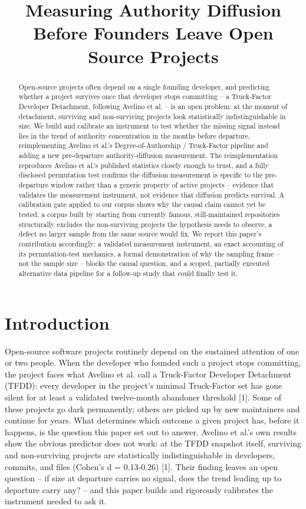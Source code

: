 \documentclass[11pt,letterpaper]{article}
\title{Measuring Authority Diffusion Before Founders Leave Open Source Projects}
\author{}
\date{}
\begin{document}
\maketitle

\begin{abstract}
Open-source projects often depend on a single founding developer, and predicting whether a project survives once that developer stops committing -- a Truck-Factor Developer Detachment, following Avelino et al. -- is an open problem: at the moment of detachment, surviving and non-surviving projects look statistically indistinguishable in size. We build and calibrate an instrument to test whether the missing signal instead lies in the trend of authority concentration in the months before departure, reimplementing Avelino et al.'s Degree-of-Authorship / Truck-Factor pipeline and adding a new pre-departure authority-diffusion measurement. The reimplementation reproduces Avelino et al.'s published statistics closely enough to trust, and a fully disclosed permutation test confirms the diffusion measurement is specific to the pre-departure window rather than a generic property of active projects -- evidence that validates the measurement instrument, not evidence that diffusion predicts survival. A calibration gate applied to our corpus shows why the causal claim cannot yet be tested: a corpus built by starting from currently famous, still-maintained repositories structurally excludes the non-surviving projects the hypothesis needs to observe, a defect no larger sample from the same source would fix. We report this paper's contribution accordingly: a validated measurement instrument, an exact accounting of its permutation-test mechanics, a formal demonstration of why the sampling frame -- not the sample size -- blocks the causal question, and a scoped, partially executed alternative data pipeline for a follow-up study that could finally test it.
\end{abstract}

\section{Introduction}

Open-source software projects routinely depend on the sustained attention of one or two people. When the developer who founded such a project stops committing, the project faces what Avelino et al. call a Truck-Factor Developer Detachment (TFDD): every developer in the project's minimal Truck-Factor set has gone silent for at least a validated twelve-month abandoner threshold [1]. Some of these projects go dark permanently; others are picked up by new maintainers and continue for years. What determines which outcome a given project has, before it happens, is the question this paper set out to answer. Avelino et al.'s own results show the obvious predictor does not work: at the TFDD snapshot itself, surviving and non-surviving projects are statistically indistinguishable in developers, commits, and files (Cohen's d = 0.13-0.26) [1]. Their finding leaves an open question -- if size at departure carries no signal, does the trend leading up to departure carry any? -- and this paper builds and rigorously calibrates the instrument needed to ask it.
\end{document}
